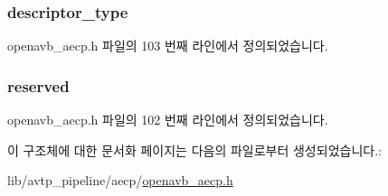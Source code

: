 \subsubsection[{\texorpdfstring{descriptor\+\_\+type}{descriptor_type}}]{ descriptor\+\_\+type}\hypertarget{structopenavb__aecp__command__data__read__descriptor__t_a1e231d7874aada5925b29affc76782cc}{}\label{structopenavb__aecp__command__data__read__descriptor__t_a1e231d7874aada5925b29affc76782cc}


openavb\+\_\+aecp.\+h 파일의 103 번째 라인에서 정의되었습니다.

\subsubsection[{\texorpdfstring{reserved}{reserved}}]{ reserved}\hypertarget{structopenavb__aecp__command__data__read__descriptor__t_ac15a687d635cc969d1bfab4d96858b77}{}\label{structopenavb__aecp__command__data__read__descriptor__t_ac15a687d635cc969d1bfab4d96858b77}


openavb\+\_\+aecp.\+h 파일의 102 번째 라인에서 정의되었습니다.



이 구조체에 대한 문서화 페이지는 다음의 파일로부터 생성되었습니다.\+:\begin{DoxyCompactItemize}
\item 
lib/avtp\+\_\+pipeline/aecp/\hyperlink{openavb__aecp_8h}{openavb\+\_\+aecp.\+h}\end{DoxyCompactItemize}
